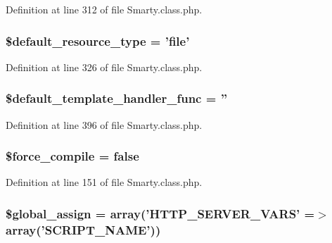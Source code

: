 \-Definition at line 312 of file \-Smarty.\-class.\-php.

\hypertarget{class_smarty_a35cf3764fb77e481ca92ef131a35ca7e}{
\subsubsection[{\$default\-\_\-resource\-\_\-type}]{\setlength{\rightskip}{0pt plus 5cm}\$default\-\_\-resource\-\_\-type = 'file'}}\label{class_smarty_a35cf3764fb77e481ca92ef131a35ca7e}


\-Definition at line 326 of file \-Smarty.\-class.\-php.

\hypertarget{class_smarty_a9ff3231160bde6632ca8ad252918e3f0}{
\subsubsection[{\$default\-\_\-template\-\_\-handler\-\_\-func}]{\setlength{\rightskip}{0pt plus 5cm}\$default\-\_\-template\-\_\-handler\-\_\-func = ''}}\label{class_smarty_a9ff3231160bde6632ca8ad252918e3f0}


\-Definition at line 396 of file \-Smarty.\-class.\-php.

\hypertarget{class_smarty_ac956f556d1b636556e96902d4d5377ff}{
\subsubsection[{\$force\-\_\-compile}]{\setlength{\rightskip}{0pt plus 5cm}\$force\-\_\-compile = false}}\label{class_smarty_ac956f556d1b636556e96902d4d5377ff}


\-Definition at line 151 of file \-Smarty.\-class.\-php.

\hypertarget{class_smarty_a23220583cbe0636d93101b05d757d76e}{
\subsubsection[{\$global\-\_\-assign}]{\setlength{\rightskip}{0pt plus 5cm}\$global\-\_\-assign = array('\-H\-T\-T\-P\-\_\-\-S\-E\-R\-V\-E\-R\-\_\-\-V\-A\-R\-S' =$>$ array('\-S\-C\-R\-I\-P\-T\-\_\-\-N\-A\-M\-E'))}}\label{class_smarty_a23220583cbe0636d93101b05d757d76e}


